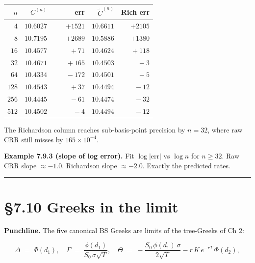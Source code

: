 \documentclass[
  10pt,
  twoside]{book}
\newcounter{none} %
\begin{document}
{\def\LTcaptype{none} %
\begin{table}[H]
\centering
\begin{tabular}{|r|r|r|r|r|}
\toprule
\(n\) & \(C^{(n)}\) & err & \(\tilde C^{(n)}\) & Rich err \\
\midrule



\(\phantom{00}4\) & \(10.6027\) & \(+1521\) & \(10.6611\) & \(+2105\) \\
\(\phantom{00}8\) & \(10.7195\) & \(+2689\) & \(10.5886\) & \(+1380\) \\
\(\phantom{0}16\) & \(10.4577\) & \(\phantom{+000}+71\) & \(10.4624\) &
\(\phantom{+0}+118\) \\
\(\phantom{0}32\) & \(10.4671\) & \(\phantom{+00}+165\) & \(10.4503\) &
\(\phantom{+000}-3\) \\
\(\phantom{0}64\) & \(10.4334\) & \(\phantom{+00}-172\) & \(10.4501\) &
\(\phantom{+000}-5\) \\
\(128\) & \(10.4543\) & \(\phantom{+000}+37\) & \(10.4494\) &
\(\phantom{+00}-12\) \\
\(256\) & \(10.4445\) & \(\phantom{+000}-61\) & \(10.4474\) &
\(\phantom{+00}-32\) \\
\(512\) & \(10.4502\) & \(\phantom{+0000}-4\) & \(10.4494\) &
\(\phantom{+00}-12\) \\
\bottomrule
\end{tabular}
\end{table}
}

The Richardson column reaches sub-basis-point precision by \(n = 32\),
where raw CRR still misses by \(165 \times 10^{-4}\).

\textbf{Example 7.9.3 (slope of log error).} Fit \(\log|\text{err}|\) vs
\(\log n\) for \(n \ge 32\). Raw CRR slope \(\approx -1.0\). Richardson
slope \(\approx -2.0\). Exactly the predicted rates.

\begin{center}\rule{0.5\linewidth}{0.5pt}\end{center}

\section{§7.10 Greeks in the limit}\label{greeks-in-the-limit}

\textbf{Punchline.} The five canonical BS Greeks are limits of the
tree-Greeks of Ch 2:

\[\Delta \;=\; \Phi(d_1), \quad \Gamma \;=\; \frac{\phi(d_1)}{S_0\,\sigma\sqrt T}, \quad \Theta \;=\; -\frac{S_0\,\phi(d_1)\,\sigma}{2\sqrt T} - r\,K\,e^{-rT}\,\Phi(d_2),\]
\end{document}
